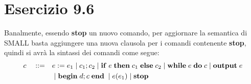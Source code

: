 \section*{Esercizio 9.6}

    
    Banalmente, essendo \textbf{stop} un nuovo comando, per aggiornare la semantica di SMALL basta aggiungere una nuova clausola per i comandi contenente \textbf{stop}, quindi si avrà la sintassi dei comandi come segue:
    \begin{align*}
        c \quad ::= \quad & e:=e_1 \;|\; c_1;c_2 \;|\; \mbox{\textbf{if}}\; e \;\mbox{\textbf{then}}\; c_1\; \mbox{\textbf{else}}\; c_2 \;|\; \mbox{\textbf{while}}\; e\; \mbox{\textbf{do}}\; c \;|\; \mbox{\textbf{output}}\; e \\
        &\;|\; \mbox{\textbf{begin}}\; d;c\; \mbox{\textbf{end}}\; \;|\; e(e_1) \;|\; \mbox{\textbf{stop}}
    \end{align*}
    
